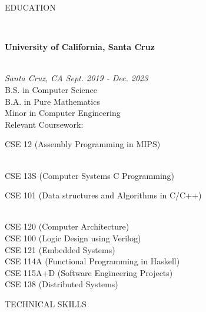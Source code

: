\documentclass[letterpaper,10pt]{article}
\begin{document}
\begin{multicols*}{2}
  \begin{LARGE} \noindent\faSchool\hspace{5px}EDUCATION \end{LARGE}
  \vspace{.5em} \\
  \begin{large}
    \textbf{University of California, Santa Cruz}
  \end{large} \\
  \textit{Santa Cruz, CA \hfill Sept. 2019 - Dec. 2023\indent} \\
  B.S. in Computer Science \\ 
  B.A. in Pure Mathematics \\
  Minor in Computer Engineering \\
  Relevant Coursework: \\
  \indent \parbox{.45\textwidth}{CSE 12 (Assembly Programming in MIPS)}\\
  \indent CSE 13S (Computer Systems C Programming)\\
  \indent \parbox{.45\textwidth}{CSE 101 (Data structures and Algorithms in C/C++)}\\
  \indent CSE 120 (Computer Architecture)\\
  \indent CSE 100 (Logic Design using Verilog)\\
  \indent CSE 121 (Embedded Systems)\\
  \indent CSE 114A (Functional Programming in Haskell) \\
  \indent CSE 115A+D (Software Engineering Projects)\\
  \indent CSE 138 (Distributed Systems)
  \vspace{1em} \\
  \begin{LARGE} \faLaptop\hspace{5px}TECHNICAL SKILLS \end{LARGE}

\end{multicols*}
\end{document}
